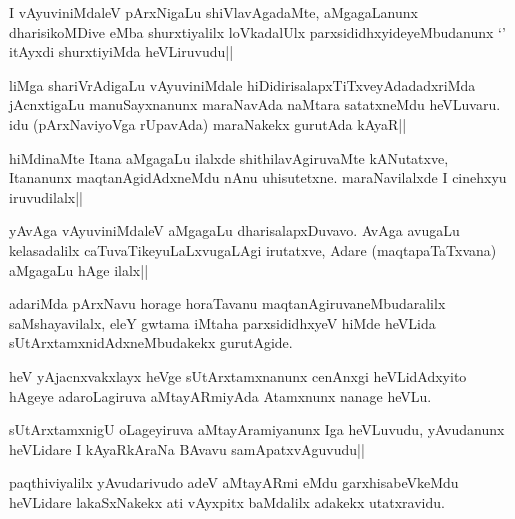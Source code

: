 \begin{artha}%
I vAyuviniMdaleV pArxNigaLu shiVlavAgadaMte, aMgagaLanunx dharisikoMDive eMba shurxtiyalilx loVkadalUlx parxsididhxyideyeMbudanunx `\stext ' itAyxdi shurxtiyiMda heVLiruvudu||
\end{artha}


\begin{artha}
liMga shariVrAdigaLu vAyuviniMdale hiDidirisalapxTiTxveyAdadadxriMda jAcnxtigaLu manuSayxnanunx maraNavAda naMtara satatxneMdu heVLuvaru. idu (pArxNaviyoVga rUpavAda) maraNakekx gurutAda kAyaR||
\end{artha}


\begin{artha}
hiMdinaMte Itana aMgagaLu ilalxde shithilavAgiruvaMte kANutatxve, Itananunx maqtanAgidAdxneMdu nAnu uhisutetxne. maraNavilalxde I cinehxyu iruvudilalx||
\end{artha}

\begin{artha}
yAvAga vAyuviniMdaleV aMgagaLu dharisalapxDuvavo. AvAga avugaLu kelasadalilx caTuvaTikeyuLaLxvugaLAgi irutatxve, Adare (maqtapaTaTxvana) aMgagaLu hAge ilalx||
\end{artha}

\begin{artha}%
adariMda pArxNavu horage horaTavanu maqtanAgiruvaneMbudaralilx saMshayavilalx, eleY gwtama iMtaha parxsididhxyeV hiMde heVLida sUtArxtamxnidAdxneMbudakekx gurutAgide.
\end{artha}

\begin{artha}
heV yAjacnxvakxlayx heVge sUtArxtamxnanunx cenAnxgi heVLidAdxyito hAgeye adaroLagiruva aMtayARmiyAda Atamxnunx nanage heVLu.
\end{artha}


\begin{artha}
sUtArxtamxnigU oLageyiruva aMtayAramiyanunx Iga heVLuvudu, yAvudanunx heVLidare I kAyaRkAraNa BAvavu samApatxvAguvudu||
\end{artha}


\begin{artha}
paqthiviyalilx yAvudarivudo adeV aMtayARmi eMdu garxhisabeVkeMdu heVLidare lakaSxNakekx ati vAyxpitx baMdalilx adakekx utatxravidu.
\end{artha}

